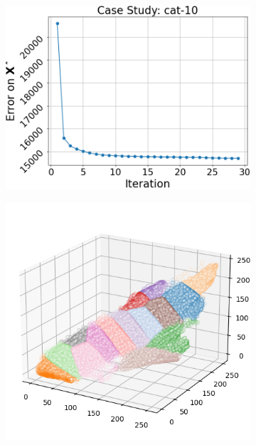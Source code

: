 \begin{figure}[htbp]
\begin{subfigure}[t]{0.32\textwidth}
    \end{subfigure}
    \begin{subfigure}[t]{0.32\textwidth}
        \includegraphics[width=\linewidth]{../../python_code/plots/kmeans/cat-10/elbow_curve.png}
    \end{subfigure}
    \begin{subfigure}[t]{0.32\textwidth}
        \includegraphics[width=\linewidth]{../../python_code/plots/kmeans/cat-10/clusters_elev20_azim-60.png}

\end{subfigure}
\end{figure}
